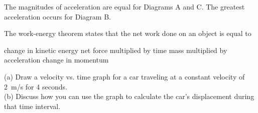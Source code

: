 \documentclass[answers]{exam}
\begin{document}
\begin{questions}
\begin{solution}
    The magnitudes of acceleration are equal for Diagrams A and C. The greatest acceleration occurs for Diagram B.
\end{solution}

\question


The work-energy theorem states that the net work done on an object is equal to 

\begin{randomizechoices}
    \correctchoice change in kinetic energy
    \choice net force multiplied by time
    \choice mass multiplied by acceleration
    \choice change in momentum 
\end{randomizechoices}

\question
(a) Draw a velocity vs. time graph for a car traveling at a constant velocity of \SI{2}{m/s} for 4 seconds.\\ (b) Discuss how you can use the graph to calculate the car's displacement during that time interval.

\begin{center}
\end{center}




\end{questions}
\end{document}
